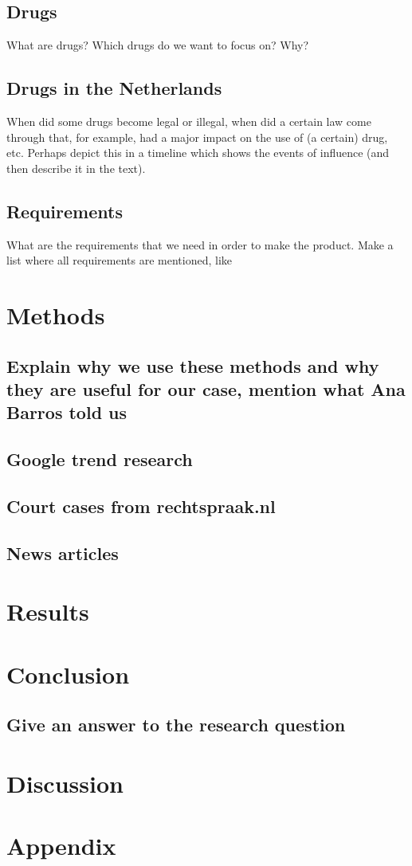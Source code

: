 \subsection{Drugs}
What are drugs? Which drugs do we want to focus on? Why? 

\subsection{Drugs in the Netherlands}
When did some drugs become legal or illegal, when did a certain law come through that, for example, had a major impact on the use of (a certain) drug, etc.
Perhaps depict this in a timeline which shows the events of influence (and then describe it in the text).

\subsection{Requirements}
What are the requirements that we need in order to make the product. Make a list where all requirements are mentioned, like 
\subsection{}

\subsection{}

\section{Methods}
\subsection{Explain why we use these methods and why they are useful for our case, mention what Ana Barros told us}
\subsection{Google trend research}
\subsection{Court cases from rechtspraak.nl}
\subsection{News articles}

\section{Results}

\section{Conclusion}
\subsection{Give an answer to the research question}

\section{Discussion}

\section{Appendix}

